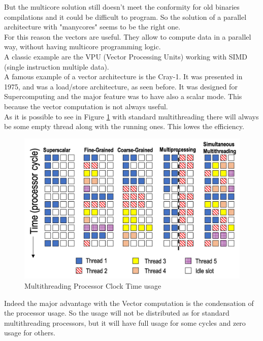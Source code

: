 But the multicore solution still doesn't meet the conformity for old binaries compilations and it could be difficult to program. So the solution of a parallel architecture with "manycores" seems to be the right one.\\

For this reason the vectors are useful. They allow to compute data in a parallel way, without having multicore programming logic.\\
A classic example are the VPU (Vector Processing Units) working with SIMD (single instruction multiple data).\\

A famous example of a vector architecture is the Cray-1. It was presented in 1975, and was a load/store architecture, as seen before.
It was designed for Supercomputing and the major feature was to have also a scalar mode. This because the vector computation is not always useful.\\

As it is possible to see in Figure \ref{Multithreading} with standard multithreading there will always be some empty thread along with the running ones. This lowes the efficiency.
\begin{figure}[H]
    \centering
    \includegraphics[scale = 0.4]{Chapter_1/img/multithreading.png}
    \caption{Multithreading Processor Clock Time usage  \cite{L15-Krste}}
    \label{Multithreading}
\end{figure}

Indeed the major advantage with the Vector computation is the condensation of the processor usage. 
So the usage will not be distributed as for standard multithreading processors, but it will have full usage for some cycles and zero usage for others\cite{L15-Krste}.\\

